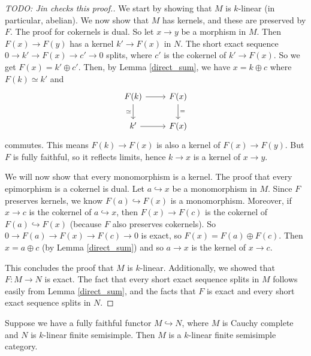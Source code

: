 \begin{proof}
  [TODO: Jin checks this proof.]

  We start by showing that $M$ is $k$-linear (in particular, abelian). We now
  show that $M$ has kernels, and these are preserved by $F$. The proof for
  cokernels is dual. So let $x\to y$ be a morphism in $M$. Then $F(x)\to F(y)$ has
  a kernel $k'\to F(x)$ in $N$. The short exact sequence $0\to k'\to F(x)\to c'\to 0$
  splits, where $c'$ is the cokernel of $k'\to F(x)$. So we get $F(x)=k'\oplus c'$.
  Then, by Lemma \ref{direct_sum}, we have $x=k\oplus c$ where $F(k)\simeq k'$ and
  \[
    \begin{tikzcd}
      {F(k)} & {F(x)} \\
      {k'} & {F(x)} \arrow[from=1-1, to=1-2] \arrow["\simeq"', from=1-1, to=2-1] \arrow["{=}", from=1-2, to=2-2] \arrow[from=2-1, to=2-2]
    \end{tikzcd}
  \]
  commutes. This means $F(k)\to F(x)$ is also a kernel of $F(x)\to F(y)$. But
  $F$ is fully faithful, so it reflects limits, hence $k\to x$ is a kernel of
  $x\to y$.

  We will now show that every monomorphism is a kernel. The proof that every
  epimorphism is a cokernel is dual. Let $a\hookrightarrow x$ be a
  monomorphism in $M$. Since $F$ preserves kernels, we know
  $F(a)\hookrightarrow F(x)$ is a monomorphism. Moreover, if $x\to c$ is the
  cokernel of $a\hookrightarrow x$, then $F(x)\to F(c)$ is the cokernel of
  $F(a)\hookrightarrow F(x)$ (because $F$ also preserves cokernels). So $0\to F(a)\to F(x)\to F(c)\to 0$ is exact, so
  $F(x)=F(a)\oplus F(c)$. Then $x=a\oplus c$ (by Lemma \ref{direct_sum}) and
  so $a\to x$ is the kernel of $x\to c$.

  This concludes the proof that $M$ is $k$-linear. Additionally, we showed that $F:M\to N$ is exact. The fact that every short exact sequence splits in $M$ follows easily from
  Lemma \ref{direct_sum}, and the facts that $F$ is exact and every short
  exact sequence splits in $N$.
\end{proof}

\begin{proposition}\label{cau_semi}
  Suppose we have a fully faithful functor $M\hookrightarrow N$,
  where $M$ is Cauchy complete and $N$ is $k$-linear finite semisimple. Then
  $M$ is a $k$-linear finite semisimple category.
\end{proposition}

